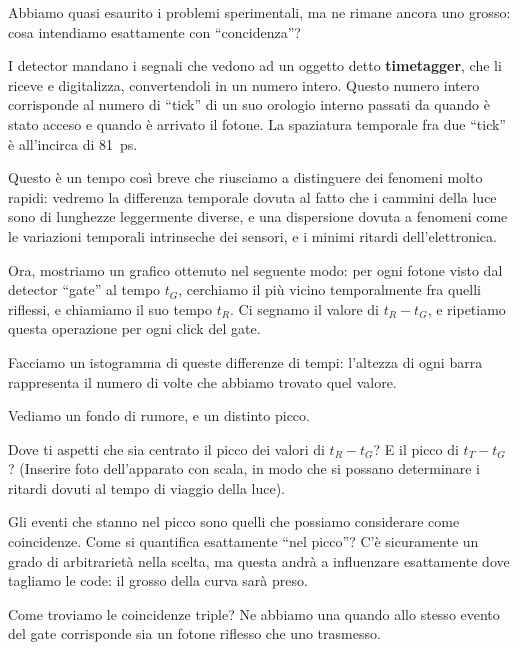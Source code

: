 \documentclass[a4paper,12pt]{article}
\begin{document}
Abbiamo quasi esaurito i problemi sperimentali, ma ne rimane ancora uno grosso: cosa intendiamo esattamente con ``concidenza''? 

I detector mandano i segnali che vedono ad un oggetto detto \textbf{timetagger}, che li riceve e digitalizza, convertendoli in un numero intero. Questo numero intero corrisponde al numero di ``tick'' di un suo orologio interno passati da quando è stato acceso e quando è arrivato il fotone.
La spaziatura temporale fra due ``tick'' è all'incirca di \SI{81}{ps}.

Questo è un tempo così breve che riusciamo a distinguere dei fenomeni molto rapidi: vedremo la differenza temporale dovuta al fatto che i cammini della luce sono di lunghezze leggermente diverse, e una dispersione dovuta a fenomeni come le variazioni temporali intrinseche dei sensori, e i minimi ritardi dell'elettronica.

Ora, mostriamo un grafico ottenuto nel seguente modo: per ogni fotone visto dal detector ``gate'' al tempo \(t_G\), cerchiamo il più vicino temporalmente fra quelli riflessi, e chiamiamo il suo tempo \(t_R\). 
Ci segnamo il valore di \(t_R - t_G\), e ripetiamo questa operazione per ogni click del gate. 

Facciamo un istogramma di queste differenze di tempi: l'altezza di ogni barra rappresenta il numero di volte che abbiamo trovato quel valore.


Vediamo un fondo di rumore, e un distinto picco.

\begin{exo}
    Dove ti aspetti che sia centrato il picco dei valori di \(t_R - t_G\)? E il picco di \(t_T - t_G\)? 
    (Inserire foto dell'apparato con scala, in modo che si possano determinare i ritardi dovuti al tempo di viaggio della luce).
\end{exo}


Gli eventi che stanno nel picco sono quelli che possiamo considerare come coincidenze. 
Come si quantifica esattamente ``nel picco''? C'è sicuramente un grado di arbitrarietà nella scelta, ma questa andrà a influenzare esattamente dove tagliamo le code: il grosso della curva sarà preso.

Come troviamo le coincidenze triple? Ne abbiamo una quando allo stesso evento del gate corrisponde sia un fotone riflesso che uno trasmesso.


\printbibliography
\end{document}
